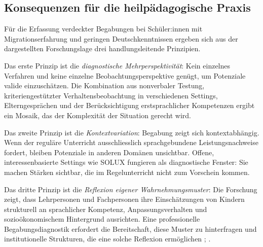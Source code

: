\documentclass[ngerman, a4paper]{article}
\begin{document}
\subsection{Konsequenzen für die heilpädagogische Praxis}

Für die Erfassung verdeckter Begabungen bei Schüler:innen mit Migrationserfahrung und
geringen Deutschkenntnissen ergeben sich aus der dargestellten Forschungslage drei
handlungsleitende Prinzipien.

Das erste Prinzip ist die \textit{diagnostische Mehrperspektivität}: Kein einzelnes
Verfahren und keine einzelne Beobachtungsperspektive genügt, um Potenziale valide
einzuschätzen. Die Kombination aus nonverbaler Testung, kriteriengestützter
Verhaltensbeobachtung in verschiedenen Settings, Elterngesprächen und der
Berücksichtigung erstsprachlicher Kompetenzen ergibt ein Mosaik, das der Komplexität
der Situation gerecht wird.

Das zweite Prinzip ist die \textit{Kontextvariation}: Begabung zeigt sich
kontextabhängig. Wenn der reguläre Unterricht ausschliesslich sprachgebundene
Leistungsnachweise fordert, bleiben Potenziale in anderen Domänen unsichtbar.
Offene, interessenbasierte Settings wie SOLUX fungieren als diagnostische Fenster: Sie
machen Stärken sichtbar, die im Regelunterricht nicht zum Vorschein kommen.

Das dritte Prinzip ist die \textit{Reflexion eigener Wahrnehmungsmuster}: Die
Forschung zeigt, dass Lehrpersonen und Fachpersonen ihre Einschätzungen von Kindern
strukturell an sprachlicher Kompetenz, Anpassungsverhalten und sozioökonomischem
Hintergrund ausrichten. Eine professionelle Begabungsdiagnostik erfordert die
Bereitschaft, diese Muster zu hinterfragen und institutionelle Strukturen, die eine
solche Reflexion ermöglichen
\parencite[S.\,576--585]{stamm2021fehlenderblick};
\parencite[S.\,161,\,163\psq]{macha2019gender}.
\end{document}
